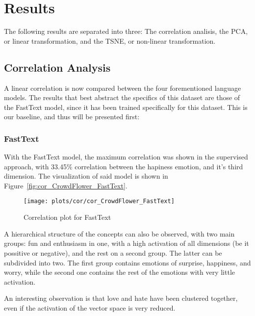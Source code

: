 \section{Results}\label{sec:Results}

The following results are separated into three: The correlation analisis, the PCA, or linear transformation, and the TSNE, or non-linear transformation.

\subsection{Correlation Analysis}\label{sub:Correlation Analysis}
A linear correlation is now compared between the four forementioned language models. The results that best abstract the specifics of this dataset are those of the FastText model, since it has been trained specifically for this dataset. This is our baseline, and thus will be presented first:


\subsubsection{FastText}
With the FastText model, the maximum correlation was shown in the supervised approach, with 33.45\% correlation between the hapiness emotion, and it's third dimension. The visualization of said model is shown in Figure~\ref{fig:cor_CrowdFlower_FastText}.

\begin{figure}[H]
  \texttt{[image: plots/cor/cor\_CrowdFlower\_FastText]}
  \centering
  \caption{Correlation plot for FastText}
\end{figure}\label{fig:cor_CrowdFlower_FastText}

A hierarchical structure of the concepts can also be observed, with two main groups: fun and enthusiasm in one, with a high activation of all dimensions (be it possitive or negative), and the rest on a second group. The latter can be subdivided into two. The first group contains emotions of surprise, happiness, and worry, while the second one contains the rest of the emotions with very little activation.

An interesting observation is that love and hate have been clustered together, even if the activation of the vector space is very reduced.


